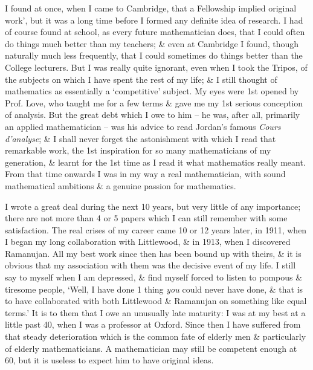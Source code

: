 \documentclass{article}
\numberwithin{equation}{section}
\begin{document}
I found at once, when I came to Cambridge, that a Fellowship implied original work', but it was a long time before I formed any definite idea of research. I had of course found at school, as every future mathematician does, that I could often do things much better than my teachers; \& even at Cambridge I found, though naturally much less frequently, that I could sometimes do things better than the College lecturers. But I was really quite ignorant, even when I took the Tripos, of the subjects on which I have spent the rest of my life; \& I still thought of mathematics as essentially a `competitive' subject. My eyes were 1st opened by Prof. Love, who taught me for a few terms \& gave me my 1st serious conception of analysis. But the great debt which I owe to him -- he was, after all, primarily an applied mathematician -- was his advice to read Jordan's famous \textit{Cours d'analyse}; \& I shall never forget the astonishment with which I read that remarkable work, the 1st inspiration for so many mathematicians of my generation, \& learnt for the 1st time as I read it what mathematics really meant. From that time onwards I was in my way a real mathematician, with sound mathematical ambitions \& a genuine passion for mathematics.

I wrote a great deal during the next 10 years, but very little of any importance; there are not more than 4 or 5 papers which I can still remember with some satisfaction. The real crises of my career came 10 or 12 years later, in 1911, when I began my long collaboration with Littlewood, \& in 1913, when I discovered Ramanujan. All my best work since then has been bound up with theirs, \& it is obvious that my association with them was the decisive event of my life. I still say to myself when I am depressed, \& find myself forced to listen to pompous \& tiresome people, `Well, I have done 1 thing \textit{you} could never have done, \& that is to have collaborated with both Littlewood \& Ramanujan on something like equal terms.' It is to them that I owe an unusually late maturity: I was at my best at a little past 40, when I was a professor at Oxford. Since then I have suffered from that steady deterioration which is the common fate of elderly men \& particularly of elderly mathematicians. A mathematician may still be competent enough at 60, but it is useless to expect him to have original ideas.
\end{document}
